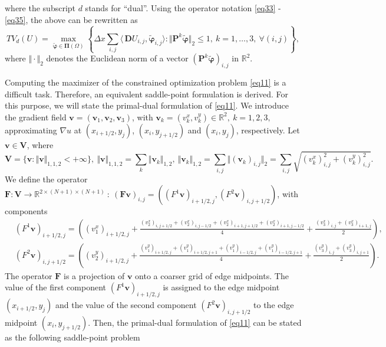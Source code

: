 \documentclass[reqno,a4paper,12pt]{amsart}
\begin{document}
where the subscript $d$ stands for ``dual''. Using the operator notation \eqref{eq33} - \eqref{eq35}, the above can be rewritten as
\begin{equation}
    TV_d(U) = \max_{\widetilde{\bm{\varphi}} \in \bm{\Pi}(\Omega)} \left\{ \Delta x \sum_{i,j} \langle\, \bm{D}U _{i,j}, \widetilde{\bm{\varphi}}_{i,j} \rangle : \Vert \bm{P}^k \widetilde{\bm{\varphi}} \Vert_2 \leq 1, ~k = 1,\dots,3,~ \forall (i,j)\right\},
    \label{eq11}
\end{equation}
where $\Vert \cdot \Vert_2$ denotes the Euclidean norm of a vector $(\bm{P}^k \widetilde{\bm{\varphi}})_{i,j}$ in $\mathbb{R}^2$. 

Computing the maximizer of the constrained optimization problem \eqref{eq11} is a difficult task. Therefore, an equivalent saddle-point formulation   \cite{rockafellar2015convex} is derived. For this purpose, we will state the primal-dual formulation of \eqref{eq11}. We introduce the gradient field $\bm{v} = (\bm{v}_1, \bm{v}_2, \bm{v}_3)$, with $\bm{v}_k = (v_k^x,v_k^y) \in \mathbb{R}^2, ~k = 1,2,3,$ approximating  $\nabla u$ at $(x_{i+1/2}, y_j)$, $(x_{i}, y_{j+1/2})$ and $(x_i,y_j)$, respectively. Let $\bm{v} \in \bm{V}$, where 
$$\bm V = \{ \bm v : \Vert \bm{v} \Vert_{1,1,2} < +\infty \}, ~\Vert \bm{v} \Vert_{1,1,2} = \sum_k \Vert \bm{v}_k \Vert_{1,2}, ~\Vert \bm{v}_k \Vert_{1,2} = \sum_{i,j} \Vert (\bm{v}_k)_{i,j} \Vert_2 = \sum_{i,j} \sqrt{(v_k^x)_{i,j}^2 + (v_k^y)_{i,j}^2 }. $$
We define the operator $\bm F : \bm{V} \rightarrow \mathbb{R}^{2 \times (N+1) \times (N+1)} ~: ~(\bm F \bm v)_{i,j} = ((F^1\bm{v})_{i+1/2,j}, (F^2\bm{v})_{i,j+1/2})$, with components
\begin{align}
        &(F^1\bm{v})_{i+1/2,j} = \left((v_1^x)_{i+1/2,j} + \frac{(v_2^x)_{i,j+1/2}+(v_2^x)_{i,j-1/2}+(v_2^x)_{i+1,j+1/2}+(v_2^x)_{i+1,j-1/2}}{4} + \frac{(v_3^x)_{i,j}+(v_3^x)_{i+1,j}}{2}
        \right), \label{eq37a} \\ 
        &(F^2\bm{v})_{i,j+1/2} = \left((v_2^y)_{i+1/2,j} + \frac{(v_1^y)_{i+1/2,j}+(v_1^y)_{i+1/2,j+1}+(v_1^y)_{i-1/2,j}+(v_1^y)_{i-1/2,j+1}}{4} + \frac{(v_3^y)_{i,j}+(v_3^y)_{i,j+1}}{2}\right).     \label{eq37b}
\end{align}
The operator $\bm{F}$ is a projection of $\bm{v}$ onto a coarser grid of edge midpoints. The value of the first component $(F^1\bm{v})_{i+1/2,j}$ is assigned to the edge midpoint $(x_{i+1/2}, y_j)$ and the value of the second component $(F^2\bm{v})_{i,j+1/2}$ to the edge midpoint $(x_{i}, y_{j+1/2})$. Then, the primal-dual formulation of \eqref{eq11} can be stated as the following saddle-point problem  
\end{document}
